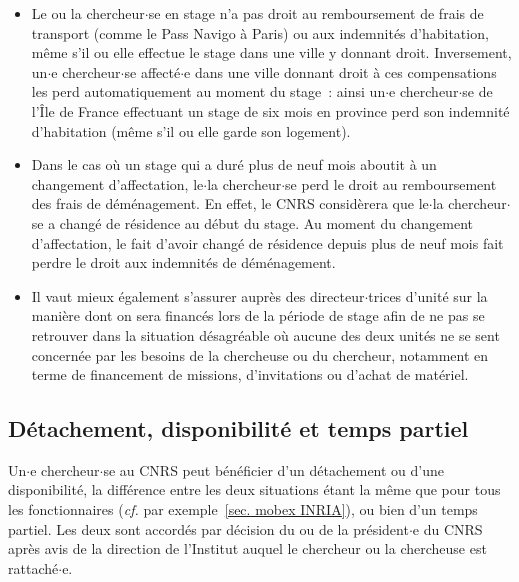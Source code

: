 \begin{itemize}
\item Le ou la chercheur$\cdot$se en stage n'a pas droit au remboursement de
frais de transport (comme le Pass Navigo \`a Paris) ou aux
indemnit\'es d'habitation, m\^eme s'il ou elle effectue le stage dans
une ville y donnant droit. Inversement, un$\cdot$e chercheur$\cdot$se affect\'e$\cdot$e
dans une ville donnant droit \`a ces compensations les perd
automatiquement au moment du stage~: ainsi un$\cdot$e chercheur$\cdot$se de l'\^Ile
de France effectuant un stage de six mois en province perd son
indemnit\'e d'habitation (m\^eme s'il ou elle garde son logement).
\item Dans le cas o\`u un stage qui a dur\'e plus de neuf mois
aboutit \`a un changement d'affectation, le$\cdot$la chercheur$\cdot$se perd le
droit au remboursement des frais de d\'em\'enagement. En effet, le
CNRS consid\`erera que le$\cdot$la chercheur$\cdot$se a chang\'e de r\'esidence au
d\'ebut du stage. Au moment du changement d'affectation, le fait
d'avoir chang\'e de r\'esidence depuis plus de neuf mois fait
perdre le droit aux indemnit\'es de d\'em\'enagement.
\item Il vaut mieux \'egalement s'assurer aupr\`es des directeur$\cdot$trices d'unit\'e sur la mani\`ere dont on sera financ\'es lors de la p\'eriode de stage afin de ne pas se retrouver dans  
la situation d\'esagr\'eable
o\`u aucune des deux unit\'es ne se sent concern\'ee
par les besoins de la chercheuse ou du chercheur, notamment en terme de financement de
missions, d'invitations ou d'achat de mat\'eriel.
\end{itemize}

\subsection{D\'etachement, disponibilit\'e et temps partiel}

Un$\cdot$e chercheur$\cdot$se au CNRS peut b\'en\'eficier d'un d\'etachement ou
d'une disponibilit\'e, la diff\'erence entre les deux situations
\'etant la m\^eme que pour tous les fonctionnaires ({\em cf.}  par exemple~\ref{sec. mobex INRIA}),
ou bien d'un temps partiel. Les deux sont accord\'es par d\'ecision du ou de la pr\'esident$\cdot$e du CNRS
 apr\`es avis de la direction de l'Institut auquel le chercheur ou la chercheuse est rattach\'e$\cdot$e.

